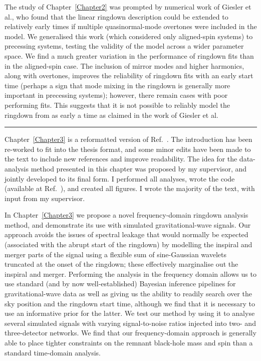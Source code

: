 \documentclass[
12pt, %
english, %
doublespacing, %
headsepline, %
]{MastersDoctoralThesis} %
\begin{document}
\vspace{0.2cm}

\noindent The study of Chapter~\ref{Chapter2} was prompted by numerical work of Giesler et al., who found that the linear ringdown description could be extended to relatively early times if multiple quasinormal-mode overtones were included in the model.
We generalised this work (which considered only aligned-spin systems) to precessing systems, testing the validity of the model across a wider parameter space.
We find a much greater variation in the performance of ringdown fits than in the aligned-spin case. 
The inclusion of mirror modes and higher harmonics, along with overtones, improves the reliability of ringdown fits with an early start time (perhaps a sign that mode mixing in the ringdown is generally more important in precessing systems); however, there remain cases with poor performing fits.
This suggests that it is not possible to reliably model the ringdown from as early a time as claimed in the work of Giesler et al.

\begin{center}
    \rule[.5ex]{.5\textwidth}{.5pt}
\end{center}

\noindent Chapter~\ref{Chapter3} is a reformatted version of Ref.~\cite{Finch:2021qph}. 
The introduction has been re-worked to fit into the thesis format, and some minor edits have been made to the text to include new references and improve readability. 
The idea for the data-analysis method presented in this chapter was proposed by my supervisor, and jointly developed to its final form.
I performed all analyses, wrote the code (available at Ref.~\cite{fdringdown}), and created all figures. 
I wrote the majority of the text, with input from my supervisor.

\vspace{0.2cm}

\noindent In Chapter~\ref{Chapter3} we propose a novel frequency-domain ringdown analysis method, and demonstrate its use with simulated gravitational-wave signals.
Our approach avoids the issues of spectral leakage that would normally be expected (associated with the abrupt start of the ringdown) by modelling the inspiral and merger parts of the signal using a flexible sum of sine-Gaussian wavelets truncated at the onset of the ringdown; these effectively marginalise out the inspiral and merger.
Performing the analysis in the frequency domain allows us to use standard (and by now well-established) Bayesian inference pipelines for gravitational-wave data as well as giving us the ability to readily search over the sky position and the ringdown start time, although we find that it is necessary to use an informative prior for the latter. 
We test our method by using it to analyse several simulated signals with varying signal-to-noise ratios injected into two- and three-detector networks. 
We find that our frequency-domain approach is generally able to place tighter constraints on the remnant black-hole mass and spin than a standard time-domain analysis.
\end{document}
